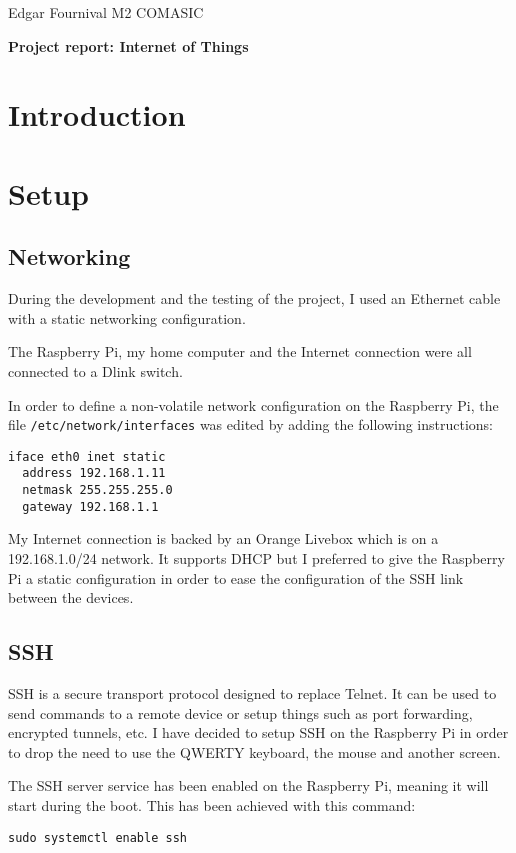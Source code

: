 \documentclass[11pt,a4paper]{article}
\newcommand{\rpi}{Raspberry Pi\xspace}
\begin{document}
Edgar Fournival \hfill M2 COMASIC

\begin{center}
  \medskip
  \LARGE\textbf{Project report: Internet of Things}
  \medskip
\end{center}

\section*{Introduction}

\section{Setup}

\subsection{Networking}

During the development and the testing of the project, I used an Ethernet cable with a static networking configuration.

The \rpi, my home computer and the Internet connection were all connected to a Dlink switch.

In order to define a non-volatile network configuration on the \rpi, the file \texttt{/etc/network/\allowbreak interfaces} was edited by adding the following instructions:
\begin{verbatim}
iface eth0 inet static
  address 192.168.1.11
  netmask 255.255.255.0
  gateway 192.168.1.1
\end{verbatim}

My Internet connection is backed by an Orange Livebox which is on a 192.168.1.0/24 network. It supports DHCP but I preferred to give the \rpi a static configuration in order to ease the configuration of the SSH link between the devices.

\subsection{SSH}

SSH is a secure transport protocol designed to replace Telnet. It can be used to send commands to a remote device or setup things such as port forwarding, encrypted tunnels, etc. I have decided to setup SSH on the \rpi in order to drop the need to use the QWERTY keyboard, the mouse and another screen.

The SSH server service has been enabled on the \rpi, meaning it will start during the boot. This has been achieved with this command:
\begin{verbatim}
sudo systemctl enable ssh
\end{verbatim}
\end{document}
